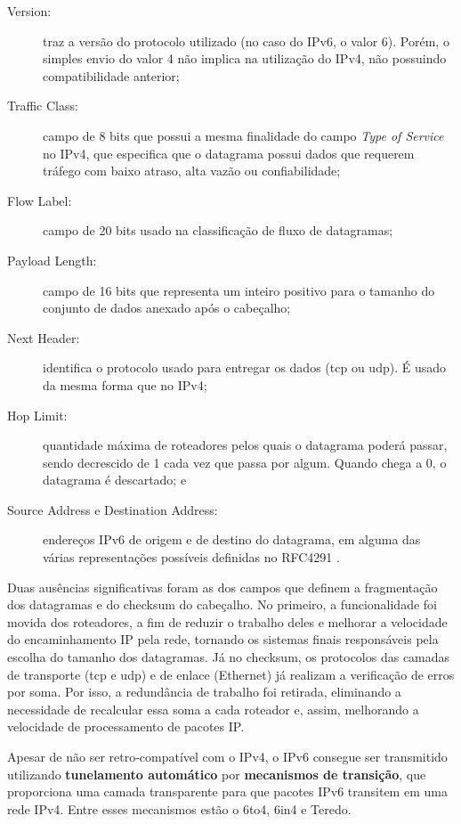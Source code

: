 \begin{description}
    \item[Version:] traz a versão do protocolo utilizado (no caso do IPv6, o valor 6).
        Porém, o simples envio do valor 4 não implica na utilização do IPv4, não
        possuindo compatibilidade anterior;

    \item[Traffic Class:] campo de 8 bits que possui a mesma finalidade do campo
        \emph{Type of Service} no IPv4, que especifica que o datagrama possui dados que
        requerem tráfego com baixo atraso, alta vazão ou confiabilidade;

    \item[Flow Label:] campo de 20 bits usado na classificação de fluxo de datagramas;

    \item[Payload Length:] campo de 16 bits que representa um inteiro positivo para o
        tamanho do conjunto de dados anexado após o cabeçalho;

    \item[Next Header:] identifica o protocolo usado para entregar os dados (\gls{tcp}
        ou \gls*{udp}). É usado da mesma forma que no IPv4;

    \item[Hop Limit:] quantidade máxima de roteadores pelos quais o datagrama poderá
        passar, sendo decrescido de 1 cada vez que passa por algum. Quando chega a 0, o
        datagrama é descartado; e

    \item[Source Address e Destination Address:] endereços IPv6 de origem e de destino
        do datagrama, em alguma das várias representações possíveis definidas no RFC4291
        \cite{site:rfcipv6add}.
\end{description}

Duas ausências significativas foram as dos campos que definem a fragmentação dos
datagramas e do \gls{checksum} do cabeçalho. No primeiro, a funcionalidade foi movida
dos roteadores, a fim de reduzir o trabalho deles e melhorar a velocidade do
encaminhamento IP pela rede, tornando os sistemas finais responsáveis pela escolha do
tamanho dos datagramas. Já no \gls*{checksum}, os protocolos das camadas de transporte
(\gls*{tcp} e \gls*{udp}) e de enlace (Ethernet) já realizam a verificação de erros por
soma. Por isso, a redundância de trabalho foi retirada, eliminando a necessidade de
recalcular essa soma a cada roteador e, assim, melhorando a velocidade de processamento
de pacotes IP.

Apesar de não ser retro-compatível com o IPv4, o IPv6 consegue ser transmitido utilizando
\textbf{tunelamento automático} por \textbf{mecanismos de transição}, que proporciona
uma camada transparente para que pacotes IPv6 transitem em uma rede IPv4. Entre esses
mecanismos estão o 6to4, 6in4 e Teredo.

